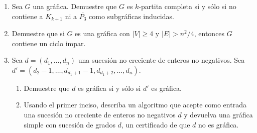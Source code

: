 \documentclass{article}
\begin{document}
\begin{enumerate}
\item Sea $G$ una gr\'afica.   Demuestre que $G$ es $k$-partita completa si y
  s\'olo si no contiene a $K_{k+1}$ ni a $\overline{P_3}$ como subgr\'aficas
  inducidas.
\item Demuestre que si $G$ es una gr\'afica con $|V| \ge 4$ y $|E| > n^2/4$,
  entonces $G$ contiene un ciclo impar.
\item Sea $d = (d_1, \dots, d_n)$ una sucesi\'on no creciente de enteros no
  negativos. Sea $d' = (d_2-1, \dots, d_{d_1+1}-1, d_{d_1+2}, \dots, d_n)$.
  \begin{enumerate}
  \item Demuestre que $d$ es gr\'afica si y s\'olo si $d'$ es gr\'afica.

  \item Usando el primer inciso, describa un algoritmo que acepte como
    entrada una sucesi\'on no creciente de enteros no negativos $d$ y
    devuelva una gr\'afica simple con sucesi\'on de grados $d$, un
    certificado de que $d$ no es gr\'afica.
  \end{enumerate}
\end{enumerate}
\end{document}

